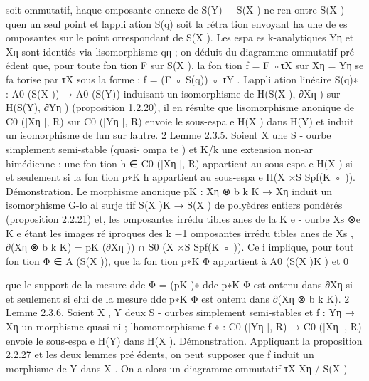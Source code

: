 \documentclass[
  10pt,
]{article}
\newenvironment{Shaded}{}{}
\newcommand{\NormalTok}[1]{#1}
\begin{document}
\begin{Shaded}
\begin{Highlighting}[]
\NormalTok{soit ommutatif, haque omposante onnexe de S(Y) − S(X ) ne ren ontre S(X ) qu\textquotesingle{}en un}
\NormalTok{seul point et l\textquotesingle{}appli ation S(q) soit la rétra tion envoyant ha une de es omposantes sur le}
\NormalTok{point orrespondant de S(X ).}
\NormalTok{   Les espa es k{-}analytiques Yη et Xη sont identiés via l\textquotesingle{}isomorphisme qη ; on déduit du}
\NormalTok{diagramme ommutatif pré édent que, pour toute fon tion F sur S(X ), la fon tion f = F ◦τX}
\NormalTok{sur Xη = Yη se fa torise par τX sous la forme :}
\NormalTok{                                     f = (F ◦ S(q)) ◦ τY .}
\NormalTok{L\textquotesingle{}appli ation linéaire}
\NormalTok{                              S(q)∗ : A0 (S(X )) → A0 (S(Y))}
\NormalTok{induisant un isomorphisme de H(S(X ), ∂Xη ) sur H(S(Y), ∂Yη ) (proposition 1.2.20), il en}
\NormalTok{résulte que l\textquotesingle{}isomorphisme anonique de C0 (|Xη |, R) sur C0 (|Yη |, R) envoie le sous{-}espa e}
\NormalTok{H(X ) dans H(Y) et induit un isomorphisme de l\textquotesingle{}un sur l\textquotesingle{}autre.                            2}
\NormalTok{Lemme 2.3.5.  Soient X         une S {-} ourbe simplement semi{-}stable (quasi{-} ompa te ) et K/k}
\NormalTok{une extension non{-}ar himédienne ; une fon tion h ∈ C0 (|Xη |, R) appartient au sous{-}espa e}
\NormalTok{H(X ) si et seulement si la fon tion p∗K h appartient au sous{-}espa e H(X ×S Spf(K ◦ )).}
\NormalTok{Démonstration. Le morphisme anonique pK : Xη ⊗            b k K → Xη induit un isomorphisme}
\NormalTok{G{-}lo al surje tif S(X )K → S(X ) de polyèdres entiers pondérés (proposition 2.2.21) et, les}
\NormalTok{ omposantes irrédu tibles anes de la K   e {-} ourbe Xs ⊗e K   e étant les images ré iproques des}
\NormalTok{                                                           k}
\NormalTok{                                                             −1}
\NormalTok{ omposantes irrédu tibles anes de Xs , ∂(Xη ⊗  b k K) = pK (∂Xη )) ∩ S0 (X ×S Spf(K ◦ )). Ce i}
\NormalTok{implique, pour tout fon tion Φ ∈ A (S(X )), que la fon tion p∗K Φ appartient à A0 (S(X )K ) et}
\NormalTok{                                     0}

\NormalTok{que le support de la mesure ddc Φ = (pK )∗ ddc p∗K Φ est ontenu dans ∂Xη si et seulement si}
\NormalTok{ elui de la mesure ddc p∗K Φ est ontenu dans ∂(Xη ⊗  b k K).                                  2}
\NormalTok{Lemme 2.3.6.  Soient X , Y deux S {-} ourbes simplement semi{-}stables et f : Yη → Xη un}
\NormalTok{morphisme quasi{-}ni ; l\textquotesingle{}homomorphisme f ∗ : C0 (|Yη |, R) → C0 (|Xη |, R) envoie le sous{-}espa e}
\NormalTok{H(Y) dans H(X ).}
\NormalTok{Démonstration. Appliquant la proposition 2.2.27 et les deux lemmes pré édents, on peut}
\NormalTok{supposer que f induit un morphisme de Y dans X . On a alors un diagramme ommutatif}
\NormalTok{                                                    τX}
\NormalTok{                                       Xη                / S(X )}


\end{Highlighting}
\end{Shaded}
\end{document}
